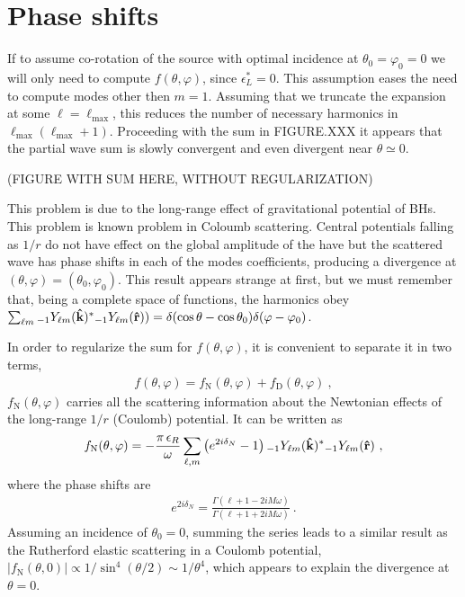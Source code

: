 
\section{Phase shifts}

If to assume co-rotation of the source with optimal incidence at $\theta_0=\varphi_0=0$ we will only need to compute $f(\theta,\varphi)$, since $\epsilon_L^*=0$.
This assumption eases the need to compute modes other then $m=1$.
Assuming that we truncate the expansion  at some $\ell=\ell_{\max}$, this reduces the number of necessary harmonics in $\ell_{\max}(\ell_{\max} + 1)$.
Proceeding with the sum in FIGURE.XXX it appears that the partial wave sum is slowly convergent and even divergent near $\theta \simeq 0$.

(FIGURE WITH SUM HERE, WITHOUT REGULARIZATION)

This problem is due to the long-range effect of gravitational potential of BHs. This problem is known problem in Coloumb scattering. Central potentials falling as $1/r$ do not have effect on the global amplitude of the have but the scattered wave has phase shifts in each of the modes coefficients, producing a divergence at $(\theta,\varphi)=(\theta_0,\varphi_0)$.
This result appears strange at first, but we must remember that, being a complete space of functions, the harmonics obey $\sum_{\ell m} \uu[-1]{Y}{\ell m}(\mathbf{\hat{k}})^{*} \uu[-1]{Y}{\ell m}(\mathbf{\hat{r}})) = \delta(\cos\theta - \cos\theta_0) \delta(\varphi - \varphi_0)$.

In order to regularize the sum for $f(\theta,\varphi)$, it is convenient to separate it in two terms,
\begin{align}
    \label{eq5:fNfD}
    f(\theta,\varphi) = f_\mathrm{N}(\theta,\varphi) + f_\mathrm{D}(\theta,\varphi) ~,
\end{align}
$f_\mathrm{N}(\theta,\varphi)$ carries all the scattering information about the Newtonian effects of the long-range $1/r$ (Coulomb) potential.
It can be written as
\begin{align}
    f_\mathrm{N}(\theta,\varphi) = - \frac{\pi \,\epsilon_R}{\omega}
    \sum_{\ell,m} \left( e^{2 i \delta_N } - 1 \right)
    \uu[-1]{Y}{\ell m}(\mathbf{\hat{k}})^{*} \uu[-1]{Y}{\ell m}(\mathbf{\hat{r}}) ~,
\end{align}
where the phase shifts are \cite{Futterman1988}
\begin{align}
    e^{2 i \delta_N } = \frac{\Gamma(\ell + 1 - 2 i M \omega)}{\Gamma(\ell+1 + 2 i M \omega)} ~.
\end{align}
Assuming an incidence of $\theta_0=0$, summing the series leads to a similar result as the Rutherford elastic scattering in a Coulomb potential, $|f_\mathrm{N}(\theta,0)| \propto 1/\sin^{4}(\theta/2) \sim 1/\theta^4$, which appears to explain the divergence at $\theta=0$. 

